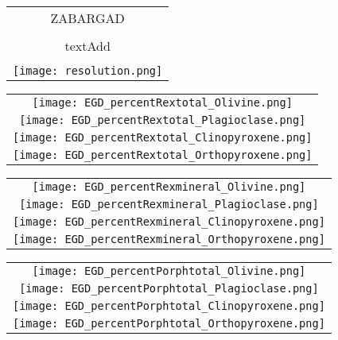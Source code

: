 \documentclass{article}
\newcommand{\framePaper}{
\begin{tikzpicture}[remember picture,overlay] 
 \draw[very thick] 
 ([yshift=-20pt,xshift=20pt]current page.north west)-- 
 ([yshift=-20pt,xshift=-20pt]current page.north east)-- 
 ([yshift=20pt,xshift=-20pt]current page.south east)-- 
 ([yshift=20pt,xshift=20pt]current page.south west)--cycle; 
 \end{tikzpicture}
 }
\begin{document}
 

\newpage


\begin{center}
\begin{tabular}{c}
\\
ZABARGAD \\
\\
textAdd
\\
\\
\texttt{[image: resolution.png]}
\end{tabular}
\end{center}

\newpage

\begin{tabular}{c}
\texttt{[image: EGD\_percentRextotal\_Olivine.png]}
\\
\texttt{[image: EGD\_percentRextotal\_Plagioclase.png]}
\\
\texttt{[image: EGD\_percentRextotal\_Clinopyroxene.png]}
\\
\texttt{[image: EGD\_percentRextotal\_Orthopyroxene.png]}

\end{tabular}

\newpage

\begin{tabular}{c}
\texttt{[image: EGD\_percentRexmineral\_Olivine.png]}
\\
\texttt{[image: EGD\_percentRexmineral\_Plagioclase.png]}
\\
\texttt{[image: EGD\_percentRexmineral\_Clinopyroxene.png]}
\\
\texttt{[image: EGD\_percentRexmineral\_Orthopyroxene.png]}
\end{tabular}

\newpage

\begin{tabular}{c}
\texttt{[image: EGD\_percentPorphtotal\_Olivine.png]}
\\
\texttt{[image: EGD\_percentPorphtotal\_Plagioclase.png]}
\\
\texttt{[image: EGD\_percentPorphtotal\_Clinopyroxene.png]}
\\
\texttt{[image: EGD\_percentPorphtotal\_Orthopyroxene.png]}
\end{tabular}
\end{document}

